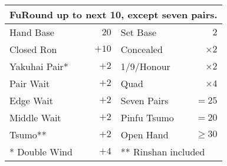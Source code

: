 \begin{tabularx}{\linewidth}{|Xr|Xr|}
  \hline
  \multicolumn{4}{|l|}{\textbf{\large Fu}\hfill Round up to next 10, except seven pairs.}\\
  \hline
  Hand Base & $20$ & Set Base & $2$ \\
  Closed Ron & $+10$ & Concealed & $\times 2$\\
  Yakuhai Pair* & $+2$ & 1/9/Honour & $\times 2$\\
  Pair Wait & $+2$ & Quad & $\times 4$\\
  \cmidrule{3-4}
  Edge Wait & $+2$ & Seven Pairs & $=25$\\
  Middle Wait & $+2$ & Pinfu Tsumo & $=20$\\
  Tsumo** & $+2$ & Open Hand & $\ge 30$\\
  \cmidrule{3-4}
  * Double Wind & $+4$ & \multicolumn{2}{l|}{** Rinshan included}\\
  \hline
\end{tabularx}
